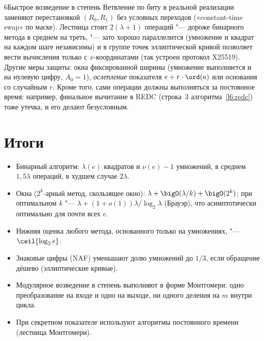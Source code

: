 \begin{lecture}{6}{Быстрое возведение в степень}
Ветвление по биту в реальной реализации заменяют перестановкой $(R_0, R_1)$ без условных переходов
(«constant-time swap» по маске). Лестница стоит $2(\lambda + 1)$ операций "--- дороже бинарного
метода в среднем на треть, "--- зато хорошо параллелится (умножение и квадрат на каждом шаге
независимы) и в группе точек эллиптической кривой позволяет вести вычисления только с
$x$-координатами (так устроен протокол X25519). Другие меры защиты: окна фиксированной
ширины (умножение выполняется и на нулевую цифру, $A_0 = 1$), \emph{ослепление}
показателя $e + r\cdot\ord(a)$ или основания со случайным $r$. Кроме того, сами операции должны
выполняться за постоянное время: например, финальное вычитание в REDC (строка~3
алгоритма~\ref{l6:redc}) тоже утечка, и его делают безусловным.


\section{Итоги}

\begin{itemize}
  \item Бинарный алгоритм: $\lambda(e)$ квадратов и $\nu(e) - 1$ умножений, в среднем
    $1{,}5\lambda$ операций, в худшем случае $2\lambda$.
  \item Окна ($2^k$-арный метод, скользящее окно): $\lambda + \bigO(\lambda/k) + \bigO(2^k)$;
    при оптимальном $k$ "--- $\lambda + (1 + o(1))\lambda/\log_2\lambda$ (Брауэр), что
    асимптотически оптимально для почти всех $e$.
  \item Нижняя оценка любого метода, основанного только на умножениях, "--- $\ceil{\log_2 e}$.
  \item Знаковые цифры (NAF) уменьшают долю умножений до $1/3$, если обращение дёшево (эллиптические
    кривые).
  \item Модулярное возведение в степень выполняют в форме Монтгомери: одно преобразование
    на входе и одно на выходе, ни одного деления на $m$ внутри цикла.
  \item При секретном показателе используют алгоритмы постоянного времени (лестница Монтгомери).
\end{itemize}

\checkyourselfsection


\end{lecture}
